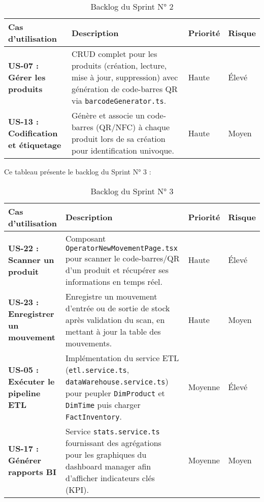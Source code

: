\documentclass[12pt,a4paper]{report}
\renewcommand{\arraystretch}{1.5}
\begin{document}
\begin{table}[H]
  \centering
  \renewcommand{\arraystretch}{2}
  \begin{tabular}{|
      >{\bfseries\centering\arraybackslash}m{} %
      |>{\raggedright\arraybackslash}m{}       %
      |>{\centering\arraybackslash}m{}         %
      |>{\centering\arraybackslash}m{}         %
    |}
    \hline
    \rowcolor{lightblue!70}
    Cas d’utilisation & Description & Priorité & Risque \\
    \hline
    US-07 : Gérer les produits & CRUD complet pour les produits (création, lecture, mise à jour, suppression) avec génération de code-barres QR via \texttt{barcodeGenerator.ts}. & Haute & Élevé \\
    \hline
    US-13 : Codification et étiquetage & Génère et associe un code-barres (QR/NFC) à chaque produit lors de sa création pour identification univoque. & Haute & Moyen \\
    \hline
  \end{tabular}
  \caption{Backlog du Sprint N° 2}
  \label{tab:backlog_sprint2}
\end{table}
\cleardoublepage

Ce tableau présente le backlog du Sprint N° 3 :\\

\begin{table}[H]
  \centering
  \renewcommand{\arraystretch}{2}
  \begin{tabular}{|
      >{\bfseries\centering\arraybackslash}m{} %
      |>{\raggedright\arraybackslash}m{}       %
      |>{\centering\arraybackslash}m{}         %
      |>{\centering\arraybackslash}m{}         %
    |}
    \hline
    \rowcolor{lightblue!70}
    Cas d’utilisation & Description & Priorité & Risque \\
    \hline
    US-22 : Scanner un produit & Composant \texttt{OperatorNewMovementPage.tsx} pour scanner le code-barres/QR d’un produit et récupérer ses informations en temps réel. & Haute & Élevé \\
    \hline
    US-23 : Enregistrer un mouvement & Enregistre un mouvement d’entrée ou de sortie de stock après validation du scan, en mettant à jour la table des mouvements. & Haute & Moyen \\
    \hline
    US-05 : Exécuter le pipeline ETL & Implémentation du service ETL (\texttt{etl.service.ts}, \texttt{dataWarehouse.service.ts}) pour peupler \texttt{DimProduct} et \texttt{DimTime} puis charger \texttt{FactInventory}. & Moyenne & Élevé \\
    \hline
    US-17 : Générer rapports BI & Service \texttt{stats.service.ts} fournissant des agrégations pour les graphiques du dashboard manager afin d’afficher indicateurs clés (KPI). & Moyenne & Moyen \\
    \hline
  \end{tabular}
  \caption{Backlog du Sprint N° 3}
  \label{tab:backlog_sprint3}
\end{table}
\cleardoublepage
\end{document}
